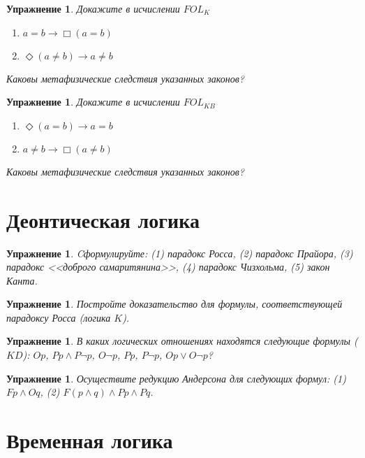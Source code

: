 \documentclass[11pt]{article}
\newtheorem{exercise}[theorem]{Упражнение}
\begin{document}
\begin{exercise} Докажите  в исчислении $FOL_{K}$
\begin{multicols}{2}
\begin{enumerate}
	\item $a = b \to \Box (a = b)$	
	\item $\Diamond (a \not = b) \to a  \not = b$	
\end{enumerate}
\end{multicols}
Каковы метафизические следствия указанных законов?
\end{exercise}

\begin{exercise} Докажите в исчислении $FOL_{KB}$
\begin{multicols}{2}
\begin{enumerate}
	\item $\Diamond (a = b) \to a = b$	
	\item $a \not = b \to \Box (a \not = b)$	  
	\end{enumerate}
\end{multicols}
Каковы метафизические следствия указанных законов?
\end{exercise}

\section{Деонтическая логика}
\begin{exercise} Cформулируйте:
(1) парадокс Росса,
(2) парадокс Прайора,
(3) парадокс <<доброго самаритянина>>,
(4) парадокс Чизхольма,
(5) закон Канта.
\end{exercise}

\begin{exercise} Постройте доказательство для формулы, соответствующей парадоксу Росса (логика $K$).
\end{exercise}

\begin{exercise} В каких логических отношениях находятся следующие формулы ($KD$): $Op$, $Pp \wedge P \neg p $, $O \neg p$, $Pp$, $P \neg p$, $Op \vee O \neg p$?
\end{exercise}

\begin{exercise} Осуществите редукцию Андерсона для следующих формул: (1) $Fp \wedge O q$, (2) $F (p \wedge q) \wedge Pp \wedge Pq$.	
\end{exercise}


\section{Временная логика}
\end{document}
